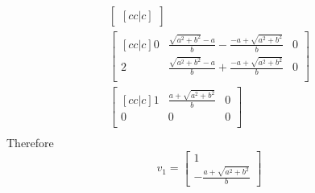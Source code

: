 \documentclass[12pt]{article}
\begin{document}
\begin{align*}
\begin{bmatrix}[cc|c]
	\end{bmatrix} \\
	\begin{bmatrix}[cc|c]
	0                      & 
	\frac {\sqrt{a^{2} + b^{2}}-a} 
	{b} 
	- \frac {- a + \sqrt{a^{2} + b^{2}}}b 
	& 0 \\
	2                        & 
	\frac {\sqrt{a^{2} + b^{2}}-a} 
	{b}
	+ \frac {- a + \sqrt{a^{2} + b^{2}}}b 
	& 0 \\                                                                       
	\end{bmatrix} \\
	\begin{bmatrix}[cc|c]
	1                        & \frac  {a + \sqrt{a^{2} + b^{2}}}    b                                   & 0 \\
	0                        & 0                                                                        & 0 \\
	\end{bmatrix} \\
\end{align*}
Therefore
\begin{equation*}
	v_1=\begin{bmatrix}
	1 \\
	- \frac  {a + \sqrt{a^{2} + b^{2}}} b
	\end{bmatrix}
\end{equation*} 
\end{document}
